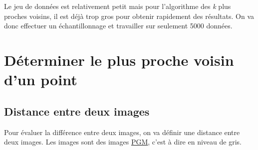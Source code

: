\documentclass[10pt,lang=french]{scrartcl}
\begin{document}
    
    Le jeu de données est relativement petit mais pour l'algorithme des
    \emph{k} plus proches voisins, il est déjà trop gros pour obtenir
    rapidement des résultats. On va donc effectuer un échantillonnage et
    travailler sur seulement 5000 données.


\section{Déterminer le plus proche voisin d'un point}

\subsection{Distance entre deux images}

        Pour évaluer la différence entre deux images, on va définir une distance
    entre deux images. Les images sont des images
    \href{https://fr.wikipedia.org/wiki/Portable_pixmap\#Fichier_binaire_2}{PGM},
    c'est à dire en niveau de gris.
\end{document}
